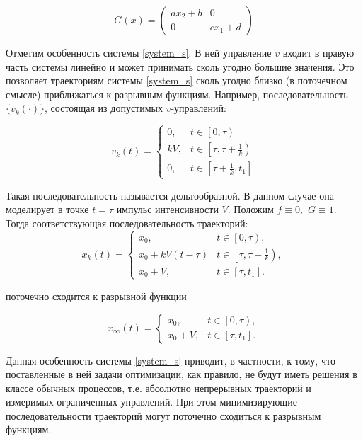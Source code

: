 \begin{equation*}
  G(x) = 
  \begin{pmatrix}
    a x_2+b & 0\\ 0 & c x_1 +d 
  \end{pmatrix}
\end{equation*}
     

Отметим особенность системы \eqref{system_s}. В ней управление $v$ входит в
правую часть системы линейно и может принимать сколь угодно большие
значения. Это позволяет траекториям системы \eqref{system_s} сколь угодно близко
(в поточечном смысле) приближаться к разрывным функциям.  Например,
последовательность $\{v_k(\cdot)\}$, состоящая из допустимых
$v$-управлений:

\begin{equation*} 
  v_k(t)=\left\{ 
    \begin{array}{ll}
      0, & t \in \left[0,\tau\right)\\
      kV,  & t\in \left[\tau,\tau+\frac{1}{k}\right)\\
      0,  & t\in \left[\tau+\frac{1}{k},t_1\right]
    \end{array}
  \right.
\end{equation*}

Такая последовательность
называется дельтообразной. В данном случае она моделирует в точке
$t=\tau$ импульс интенсивности $V$.  Положим $f\equiv 0,$
$G\equiv 1$. Тогда соответствующая последовательность траекторий:
\begin{equation*}
  x_{k}(t)=\left\{
    \begin{array}{ll}
      x_0, & t \in \left[0,\tau \right), \\
      x_0+kV(t-\tau) & t \in \left[\tau,\tau+\frac{1}{k} \right),\\
      x_0+V, & t\in [\tau,t_1].
    \end{array} \right.
\end{equation*}

поточечно сходится к разрывной функции

\begin{equation*}
  x_{\infty}(t)=\left\{
    \begin{array}{ll}
      x_0, & t \in \left[0,\tau \right), \\
      x_0+V, & t\in [\tau,t_1].
    \end{array} \right.
\end{equation*}

Данная особенность системы \eqref{system_s} приводит, в частности, к тому, что
поставленные в ней задачи оптимизации, как правило, не будут иметь
решения в классе обычных процессов, т.е. абсолютно непрерывных
траекторий и измеримых ограниченных управлений. При этом
минимизирующие последовательности траекторий могут поточечно сходиться
к разрывным функциям.


